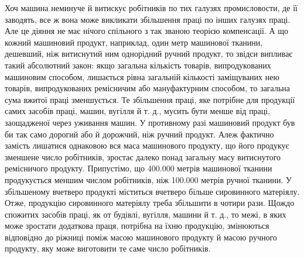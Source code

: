 Хоч машина неминуче й витискує робітників по тих галузях
промисловости, де її заводять, все ж вона може викликати збільшення
праці по інших галузях праці. Але це діяння не має нічого
спільного з так званою теорією компенсації. А що кожний машиновий
продукт, наприклад, один метр машинової тканини, дешевший,
ніж витиснутий ним однорідний ручний продукт, то звідси випливає
такий абсолютний закон: якщо загальна кількість товарів,
випродукованих машиновим способом, лишається рівна загальній
кількості заміщуваних нею товарів, випродукованих ремісничим
або мануфактурним способом, то загальна сума вжитої праці
зменшується. Те збільшення праці, яке потрібне для продукції
самих засобів праці, машин, вугілля й т. д., мусить бути менше
від праці, заощадженої через уживання машин. У противному
разі машиновий продукт був би так само дорогий або й дорожчий,
ніж ручний продукт. Алеж фактично замість лишатися однаковою
вся маса машинового продукту, що його продукує зменшене
число робітників, зростає далеко понад загальну масу витиснутого
ремісничого продукту. Припустімо, що 400.000 метрів машинової
тканини продукується меншим числом робітників, ніж 100.000
метрів ручної тканини. У збільшеному вчетверо продукті міститься
вчетверо більше сировинного матеріялу. Отже, продукцію
сировинного матеріялу треба збільшити в чотири рази. Щождо
спожитих засобів праці, як от будівлі, вугілля, машини й т. д.,
то межі, в яких може зростати додаткова праця, потрібна на їхню
продукцію, змінюються відповідно до ріжниці поміж масою машинового
продукту й масою ручного продукту, яку може виготовити
те саме число робітників.

